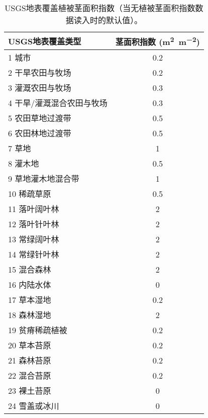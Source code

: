 \begin{table}[htbp]
\centering
\caption{USGS地表覆盖植被茎面积指数（当无植被茎面积指数数据读入时的默认值）。}
\label{tab:USGS地表覆盖植被茎面积指数}
\begin{tabular}{@{}lc@{}}
\toprule
USGS地表覆盖类型     & 茎面积指数 (\unit{m^2.m^{-2}}) \\ \midrule
1 城市           & 0.2       \\
2 干旱农田与牧场      & 0.2       \\
3 灌溉农田与牧场      & 0.3       \\
4 干旱/灌溉混合农田与牧场 & 0.3       \\
5 农田草地过渡带      & 0.5       \\
6 农田林地过渡带      & 0.5       \\
7 草地           & 1         \\
8 灌木地          & 0.5       \\
9 草地灌木地混合带     & 1         \\
10 稀疏草原        & 0.5       \\
11 落叶阔叶林       & 2         \\
12 落叶针叶林       & 2         \\
13 常绿阔叶林       & 2         \\
14 常绿针叶林       & 2         \\
15 混合森林        & 2         \\
16 内陆水体        & 0         \\
17 草本湿地        & 0.2       \\
18 森林湿地        & 2         \\
19 贫瘠稀疏植被      & 0.2       \\
20 草本苔原        & 0.2       \\
21 森林苔原        & 0.2       \\
22 混合苔原        & 0.2       \\
23 裸土苔原        & 0         \\
24 雪盖或冰川       & 0         \\\bottomrule
\end{tabular}
\end{table}

